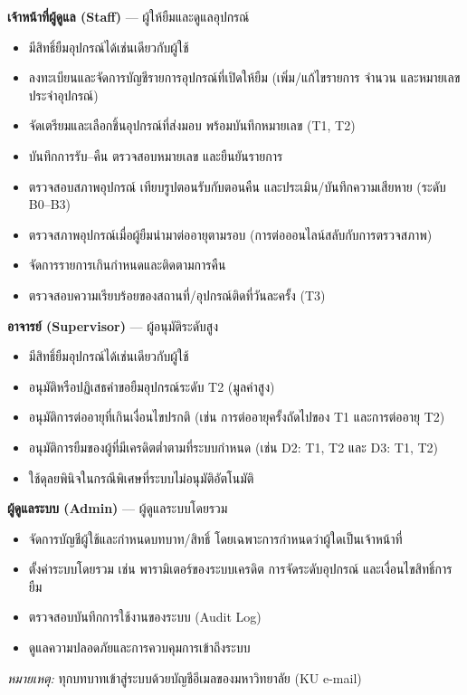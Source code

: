 \noindent\textbf{เจ้าหน้าที่ผู้ดูแล (Staff)} — ผู้ให้ยืมและดูแลอุปกรณ์
\begin{itemize}
  \item มีสิทธิ์ยืมอุปกรณ์ได้เช่นเดียวกับผู้ใช้
  \item ลงทะเบียนและจัดการบัญชีรายการอุปกรณ์ที่เปิดให้ยืม (เพิ่ม/แก้ไขรายการ จำนวน และหมายเลขประจำอุปกรณ์)
  \item จัดเตรียมและเลือกชิ้นอุปกรณ์ที่ส่งมอบ พร้อมบันทึกหมายเลข (T1, T2)
  \item บันทึกการรับ–คืน ตรวจสอบหมายเลข และยืนยันรายการ
  \item ตรวจสอบสภาพอุปกรณ์ เทียบรูปตอนรับกับตอนคืน และประเมิน/บันทึกความเสียหาย (ระดับ B0–B3)
  \item ตรวจสภาพอุปกรณ์เมื่อผู้ยืมนำมาต่ออายุตามรอบ (การต่อออนไลน์สลับกับการตรวจสภาพ)
  \item จัดการรายการเกินกำหนดและติดตามการคืน
  \item ตรวจสอบความเรียบร้อยของสถานที่/อุปกรณ์ติดที่วันละครั้ง (T3)
\end{itemize}

\noindent\textbf{อาจารย์ (Supervisor)} — ผู้อนุมัติระดับสูง
\begin{itemize}
  \item มีสิทธิ์ยืมอุปกรณ์ได้เช่นเดียวกับผู้ใช้
  \item อนุมัติหรือปฏิเสธคำขอยืมอุปกรณ์ระดับ T2 (มูลค่าสูง)
  \item อนุมัติการต่ออายุที่เกินเงื่อนไขปรกติ (เช่น การต่ออายุครั้งถัดไปของ T1 และการต่ออายุ T2)
  \item อนุมัติการยืมของผู้ที่มีเครดิตต่ำตามที่ระบบกำหนด (เช่น D2: T1, T2 และ D3: T1, T2)
  \item ใช้ดุลยพินิจในกรณีพิเศษที่ระบบไม่อนุมัติอัตโนมัติ
\end{itemize}

\noindent\textbf{ผู้ดูแลระบบ (Admin)} — ผู้ดูแลระบบโดยรวม
\begin{itemize}
  \item จัดการบัญชีผู้ใช้และกำหนดบทบาท/สิทธิ์ โดยเฉพาะการกำหนดว่าผู้ใดเป็นเจ้าหน้าที่
  \item ตั้งค่าระบบโดยรวม เช่น พารามิเตอร์ของระบบเครดิต การจัดระดับอุปกรณ์ และเงื่อนไขสิทธิ์การยืม
  \item ตรวจสอบบันทึกการใช้งานของระบบ (Audit Log)
  \item ดูแลความปลอดภัยและการควบคุมการเข้าถึงระบบ
\end{itemize}

\noindent\textit{หมายเหตุ:} ทุกบทบาทเข้าสู่ระบบด้วยบัญชีอีเมลของมหาวิทยาลัย (KU e-mail)


